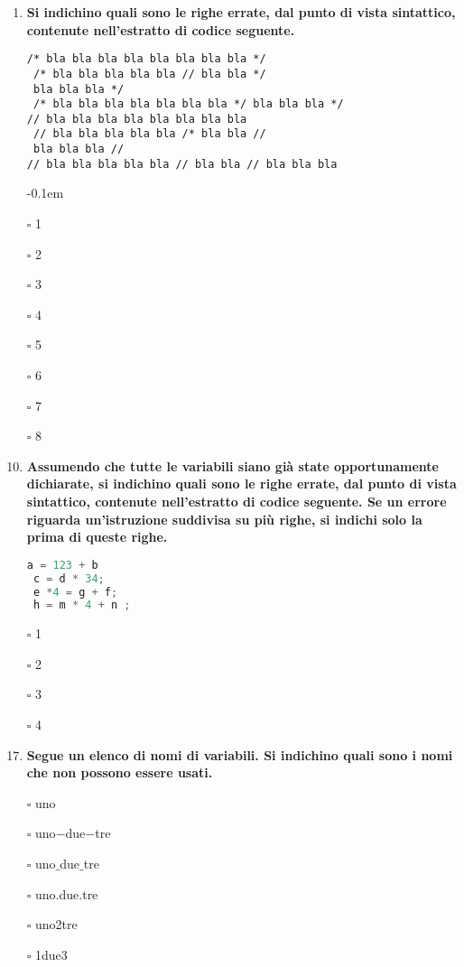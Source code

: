 \documentclass[9pt]{article}
\begin{document}
\begin{enumerate}
\item {\bf Si indichino quali sono le righe errate, dal punto di vista sintattico, contenute nell'estratto di codice seguente. }
\begin{lstlisting}[]
/* bla bla bla bla bla bla bla bla */
 /* bla bla bla bla bla // bla bla */
 bla bla bla */
 /* bla bla bla bla bla bla bla */ bla bla bla */
// bla bla bla bla bla bla bla bla
 // bla bla bla bla bla /* bla bla //
 bla bla bla //
// bla bla bla bla bla // bla bla // bla bla bla
\end{lstlisting}
\itemsep-0.1em
\item[$\square$] 1
\item[$\square$] 2
\item[$\square$] 3
\item[$\square$] 4
\item[$\square$] 5
\item[$\square$] 6
\item[$\square$] 7
\item[$\square$] 8

\item {\bf Assumendo che tutte le variabili siano già state opportunamente dichiarate, si 
 indichino quali sono le righe errate, dal punto di vista sintattico, contenute nell'estratto di codice seguente. 
 Se un errore riguarda un'istruzione
 suddivisa su pi\`{u} righe, si indichi solo la prima di queste righe.}
 \begin{lstlisting}[language=c]
 a = 123 + b
 c = d * 34;
 e *4 = g + f;
 h = m * 4 + n ;
 \end{lstlisting}
\item [\nonumber]
\item [\nonumber]
\item[$\square$] 1
\item[$\square$] 2
\item[$\square$] 3
\item[$\square$] 4

 \item {\bf Segue un elenco di nomi di variabili. Si indichino quali sono i nomi che non possono essere usati.}
\item[$\square$]  uno
\item[$\square$] uno$-$due$-$tre
\item[$\square$]  uno$\_$due$\_$tre
\item[$\square$]  uno.due.tre
\item[$\square$]  uno2tre
\item[$\square$] 1due3


\end{enumerate}
\end{document}
